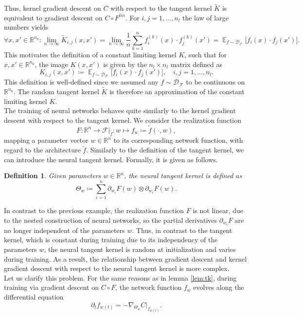 \documentclass[11pt, a4paper]{article}
\newtheorem{definition}[theorem]{Definition}
\newcommand{\R}{\mathbb{R}}
\newcommand{\D}{\mathcal{D}}
\newcommand{\F}{\mathcal{F}}
\DeclareMathOperator*{\E}{\mathbb{E}}
\begin{document}
Thus, kernel gradient descent on $C$ with respect to the tangent kernel $\tilde{K}$ is equivalent to gradient descent on $C \circ F^\textit{lin}$. For $i,j = 1, \dots, n_l$ the law of large numbers yields
\[ \forall x,x' \in \R^{n_0} : \lim_{n \to \infty} \tilde{K}_{i,j}(x,x') = \lim_{n \to \infty} \frac{1}{n} \sum_{k=1}^{n} f_i^{(k)}(x) \cdot f_j^{(k)}(x') = \E_{f \sim \D_{\F}} \Big [ f_i(x) \cdot f_j(x') \Big ]. \]
This motivates the definition of a constant limiting kernel $K$, such that for $x,x' \in \R^{n_0}$, the image $K(x,x')$ is given by the $n_l \times n_l$ matrix defined as
\[ K_{i,j}(x,x') \coloneq \E_{f \sim \D_{\F}} \Big [ f_i(x) \cdot f_j(x') \Big ], \quad i,j=1,\dots,n_l. \]
This definition is well-defined since we assumed any $f \sim \D_\F$ to be continuous on $\R^{n_0}$. The random tangent kernel $\tilde{K}$ is therefore an approximation of the constant limiting kernel $K$. \\

The training of neural networks behaves quite similarly to the kernel gradient descent with respect to the tangent kernel. We consider the realization function
\[ F: \R^n \to \F|_{\tilde{f}} : w \mapsto f_w \coloneq \tilde{f}(\cdot,w), \]
mapping a parameter vector $w \in \R^n$ to its corresponding network function, with regard to the architecture $\tilde{f}$. Similarly to the definition of the tangent kernel, we can introduce the neural tangent kernel. Formally, it is given as follows.
 
\begin{definition} \label{def:ntk}
Given parameters $w \in \R^n$, the neural tangent kernel is defined as
\[ \Theta_w \coloneq \sum_{i=1}^{n} \partial_{w_i} F(w) \otimes \partial_{w_i} F(w). \]
\end{definition}

In contrast to the previous example, the realization function $F$ is not linear, due to the nested construction of neural networks, so the partial derivatives $\partial_{w_i}F$ are no longer independent of the parameters $w$. Thus, in contrast to the tangent kernel, which is constant during training due to its independency of the parameters $w$, the neural tangent kernel is random at initialization and varies during training. As a result, the relationship between gradient descent and kernel gradient descent with respect to the neural tangent kernel is more complex. \\

Let us clarify this problem. For the same reasons as in lemma \ref{lem:tk}, during training via gradient descent on $C \circ F$, the network function $f_w$ evolves along the differential equation
\[ \partial_tf_{w(t)} = -\nabla_{\Theta_w}C|_{f_{w(t)}}. \]
\end{document}
